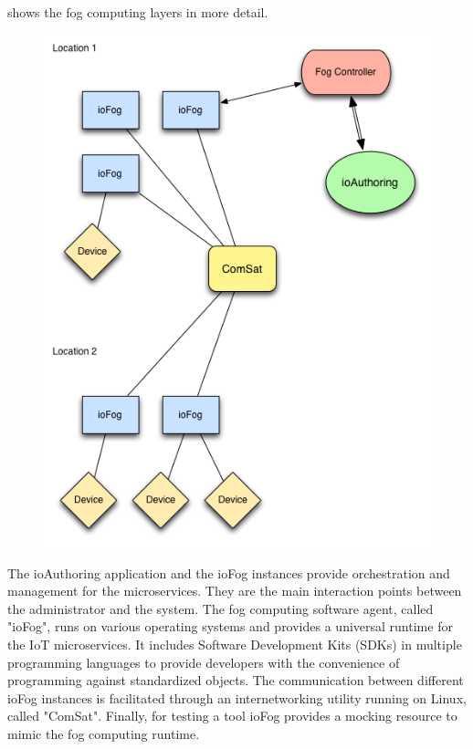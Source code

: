  shows the fog computing layers in more detail.
\begin{figure}[!ht]
    \centering
    \includegraphics[scale=0.45]{figures/ioFog-Component_Diagram.png}
    \label{fig:ioFogComponent}
\end{figure}
The ioAuthoring application and the ioFog instances provide orchestration and management for the microservices. They are the main interaction points between the administrator and the system.
The fog computing software agent, called "ioFog", runs on various operating systems and provides a universal runtime for the IoT microservices. It includes Software Development Kits (SDKs) in multiple programming languages to provide developers with the convenience of programming against standardized objects. The communication between different ioFog instances is facilitated through an internetworking utility running on Linux, called "ComSat". Finally, for testing a tool ioFog provides a mocking resource to mimic the fog computing runtime.


